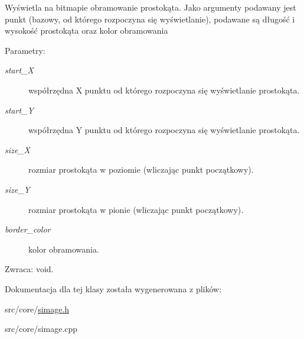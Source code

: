 Wyświetla na bitmapie obramowanie prostokąta. Jako argumenty podawany jest punkt (bazowy, od którego rozpoczyna się wyświetlanie), podawane są długość i wysokość prostokąta oraz kolor obramowania \begin{Desc}
\item[Parametry:]
\begin{description}
\item[{\em start\_\-X}]współrzędna X punktu od którego rozpoczyna się wyświetlanie prostokąta. \item[{\em start\_\-Y}]współrzędna Y punktu od którego rozpoczyna się wyświetlanie prostokąta. \item[{\em size\_\-X}]rozmiar prostokąta w poziomie (wliczając punkt początkowy). \item[{\em size\_\-Y}]rozmiar prostokąta w pionie (wliczając punkt początkowy). \item[{\em border\_\-color}]kolor obramowania. \end{description}
\end{Desc}
\begin{Desc}
\item[Zwraca:]void. \end{Desc}


Dokumentacja dla tej klasy została wygenerowana z plików:\begin{CompactItemize}
\item 
src/core/\hyperlink{simage_8h}{simage.h}\item 
src/core/simage.cpp\end{CompactItemize}
